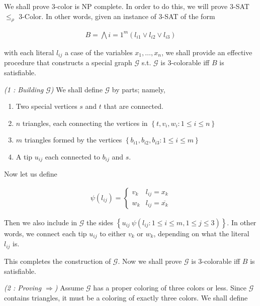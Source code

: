 \documentclass[a4paper, 12pt]{article}
\begin{document}
We shall prove $3$-color is NP complete. In order to do this, we will prove 
$3$-SAT $\leq_{\rho}$ $3$-Color. In other words, given an instance of $3$-SAT 
of the form 

\begin{align*}
    B = \bigwedge{i=1}^{m} (l_{i1} \lor  l_{i2} \lor  l_{i3})
\end{align*}

with each literal $l_{ij}$ a case of the variables $x_1, \ldots, x_n$, we shall
provide an effective procedure that constructs a special graph $\mathcal{G}$
s.t. $\mathcal{G}$ is $3$-colorable iff $B$ is satisfiable.

\textit{(1 : Building $\mathcal{G}$)} We shall define $\mathcal{G}$ by parts; namely, 

\begin{enumerate}
    \item Two special vertices $s$ and $t$ that are connected.
    \item $n$ triangles, each connecting the vertices in $\left\{ t, v_{i}, w_{i} : 1 \leq i \leq n \right\} $
    \item $m$ triangles formed by the vertices $\left\{ b_{i1}, b_{i2}, b_{i3} : 1 \leq i \leq m \right\} $
    \item A tip $u_{ij}$ each connected to $b_{ij}$ and $s$.
\end{enumerate}

Now let us define 

\begin{align*}
    \psi(l_{ij}) = \begin{cases}
        v_{k} & l_{ij} = x_k  \\ 
        w_{k} & l_{ij} = \overline{x_k}
    \end{cases}
\end{align*}

Then we also include in $\mathcal{G}$ the sides $\left\{ u_{ij} ~ \psi(l_{ij} :
1 \leq i \leq m, 1 \leq j \leq 3) \right\} $. In other words, we connect each
tip $u_{ij}$ to either $v_k$ or $w_k$, depending on what the literal $l_{ij}$
is.

This completes the construction of $\mathcal{G}$. Now we shall prove 
$\mathcal{G}$ is 3-colorable iff $B$ is satisfiable.

\textit{(2 : Proving $\Rightarrow$)} Assume $\mathcal{G}$ has a proper coloring
of three colors or less. Since $\mathcal{G}$ contains triangles,
it must be a coloring of exactly three colors. We shall define 
\end{document}
